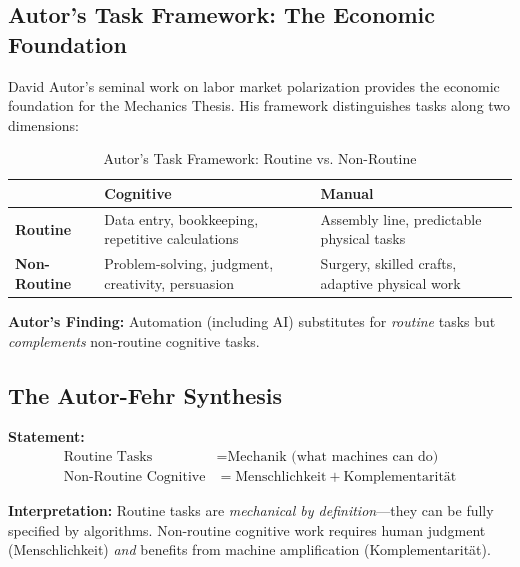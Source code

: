 \subsection{Autor's Task Framework: The Economic Foundation}

David Autor's seminal work on labor market polarization provides the economic foundation for the Mechanics Thesis. His framework distinguishes tasks along two dimensions:

\begin{table}[htbp]
\centering
\caption{Autor's Task Framework: Routine vs. Non-Routine}
\label{tab:hi-autor-framework}
\renewcommand{\arraystretch}{1.5}
\begin{tabular}{@{}p{3cm}p{5cm}p{5cm}@{}}
\toprule
 & \textbf{Cognitive} & \textbf{Manual} \\
\midrule
\textbf{Routine} & Data entry, bookkeeping, repetitive calculations & Assembly line, predictable physical tasks \\
\textbf{Non-Routine} & Problem-solving, judgment, creativity, persuasion & Surgery, skilled crafts, adaptive physical work \\
\bottomrule
\end{tabular}
\end{table}

\textbf{Autor's Finding:} Automation (including AI) substitutes for \textit{routine} tasks but \textit{complements} non-routine cognitive tasks.

\subsection{The Autor-Fehr Synthesis}

\begin{tcolorbox}[colback=gray!5!white, colframe=gray!75!black,
    title=Axiom AF-1: Mapping Autor to the Mechanics Thesis]
\textbf{Statement:}
\begin{align}
\text{Routine Tasks} &= \text{Mechanik (what machines can do)} \\
\text{Non-Routine Cognitive} &= \text{Menschlichkeit} + \text{Komplementarität}
\end{align}

\textbf{Interpretation:} Routine tasks are \textit{mechanical by definition}---they can be fully specified by algorithms. Non-routine cognitive work requires human judgment (Menschlichkeit) \textit{and} benefits from machine amplification (Komplementarität).
\end{tcolorbox}

